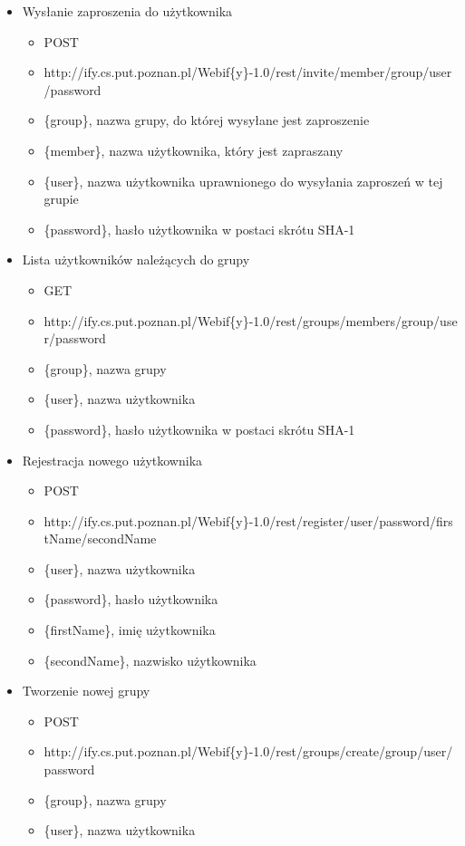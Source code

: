 \documentclass[11pt,a4paper,polish,thesis]{dcsbook}
\begin{document}
\begin{itemize}
	\item Wysłanie zaproszenia do użytkownika
	\begin{itemize}
		\item POST
		\item http://ify.cs.put.poznan.pl/Webif\{y\}-1.0/rest/invite/{member}/{group}/{user}/{password}
		\item \{group\}, nazwa grupy, do której wysyłane jest zaproszenie
		\item \{member\}, nazwa użytkownika, który jest zapraszany
		\item \{user\}, nazwa użytkownika uprawnionego do wysyłania zaproszeń w tej grupie
		\item \{password\},  hasło użytkownika w postaci skrótu SHA-1
	\end{itemize}
	\item Lista użytkowników należących do grupy
	\begin{itemize}
		\item GET
		\item http://ify.cs.put.poznan.pl/Webif\{y\}-1.0/rest/groups/members/{group}/{user}/{password}
		\item \{group\}, nazwa grupy
		\item \{user\}, nazwa użytkownika
		\item \{password\},  hasło użytkownika w postaci skrótu SHA-1
	\end{itemize}
	\item Rejestracja nowego użytkownika
	\begin{itemize}
		\item POST
		\item http://ify.cs.put.poznan.pl/Webif\{y\}-1.0/rest/register/{user}/{password}/{firstName}/{secondName}
		\item \{user\}, nazwa użytkownika
		\item \{password\},  hasło użytkownika 
		\item \{firstName\}, imię użytkownika
		\item \{secondName\}, nazwisko użytkownika
	\end{itemize}
	\item Tworzenie nowej grupy
	\begin{itemize}
		\item POST
		\item http://ify.cs.put.poznan.pl/Webif\{y\}-1.0/rest/groups/create/{group}/{user}/{password}
		\item \{group\}, nazwa grupy
		\item \{user\}, nazwa użytkownika

\end{itemize}
\end{itemize}
\end{document}
